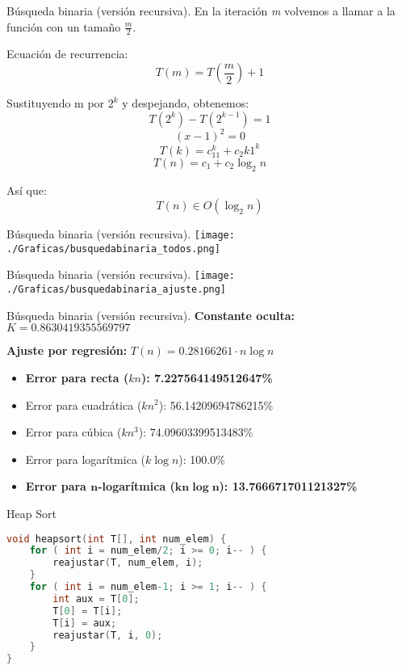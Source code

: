 \documentclass[10pt, xcolor=table]{beamer}
\begin{document}
\begin{frame}[fragile]{Búsqueda binaria (versión recursiva). 
}
En la iteración \textit{m} volvemos a llamar a la función con un tamaño $\frac{\textit{m}}{2}$. 

Ecuación de recurrencia: $$T(m) = T\left(\frac{m}{2}\right) +1$$

Sustituyendo m por $2^k$ y despejando, obtenemos: $$T(2^k)-T(2^{k-1}) = 1$$ $$(x-1)^2 = 0$$ $$T(k) = c_11^k + c_2k1^k$$ $$T(n) = c_1 + c_2\log_2{n}$$

Así que: $$T(n) \in O(\log_2{n})$$
\end{frame}

\begin{frame}[fragile]{Búsqueda binaria (versión recursiva). 
}
\texttt{[image: ./Graficas/busquedabinaria\_todos.png]}
\end{frame}

\begin{frame}[fragile]{Búsqueda binaria (versión recursiva). 
}
\texttt{[image: ./Graficas/busquedabinaria\_ajuste.png]}
\end{frame}

\begin{frame}[fragile]{Búsqueda binaria (versión recursiva). 
	}
\textbf{Constante oculta:} $K=0.8630419355569797$

\textbf{Ajuste por regresión:} $T(n)=0.28166261 \cdot n\log n$
\begin{itemize}
	\item \textbf{Error para recta ($kn$): 7.227564149512647\%}
	\item Error para cuadrática ($kn^2$): 56.14209694786215\%
	\item Error para cúbica ($kn^3$): 74.09603399513483\%
	\item Error para logarítmica ($k\log n$): 100.0\%
	\item \textbf{Error para $\boldsymbol{n}$-logarítmica ($\boldsymbol{kn\log n}$): 13.766671701121327\%}
\end{itemize}
\end{frame}

\begin{frame}[fragile]{Heap Sort}
\begin{lstlisting}[language=C]
void heapsort(int T[], int num_elem) {
	for ( int i = num_elem/2; i >= 0; i-- ) {
		reajustar(T, num_elem, i);
	}
	for ( int i = num_elem-1; i >= 1; i-- ) {
		int aux = T[0];
		T[0] = T[i];
		T[i] = aux;
		reajustar(T, i, 0);
	}
}
\end{lstlisting}
\end{frame}
\end{document}
